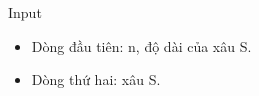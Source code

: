 Input
\begin{itemize}
	\item     Dòng đầu tiên: n, độ dài của xâu S.   
	\item     Dòng thứ hai: xâu S.   
\end{itemize}